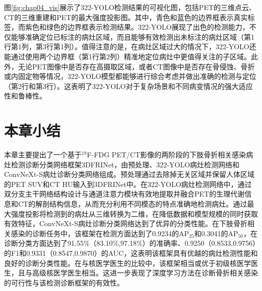图\ref{fig:chap04_vis}展示了322-YOLO检测结果的可视化图，包括PET的三维点云、CT的三维重建和PET的最大强度投影图。其中，青色和蓝色的边界框表示真实标签，而紫色和绿色的边界框表示检测结果。322-YOLO展现了出色的检测能力，不仅能够准确定位已标注的病灶区域，而且能够有效检测出未标注的病灶区域（第1行第1列，第3行第1列）。值得注意的是，在病灶区域过大的情况下，322-YOLO还能通过使用两个边界框（第1行第2列）精准地定位病灶中更值得关注的子区域。此外，无论PET图像中是否存在高摄取区域，或者CT图像中是否存在骨侵蚀、骨折或内固定物等情况，322-YOLO模型都能够进行综合考虑并做出准确的检测与定位（第2行和第3行）。这表明了322-YOLO对于复杂场景和不同病变情况的强大适应性和鲁棒性。

\section{本章小结}

本章主要提出了一个基于\(^{18}\)F-FDG PET/CT影像的两阶段的下肢骨折相关感染病灶检测诊断分类网络框架3DFRINet，由预处理、322-YOLO病灶检测网络和ConvNeXt-S病灶诊断分类网络组成。预处理通过去除掉无关区域并保留人体区域的PET SUV和CT HU输入到3DFRINet中。在322-YOLO病灶检测网络中，通过双分支主干网络结构设计与通道注意力模块有效地提取并融合PET的生理代谢信息和CT的解剖结构信息，从而充分利用不同模态的特点准确地检测病灶。通过最大强度投影将检测到的病灶从三维转换为二维，在降低数据和模型规模的同时获取有效特征，ConvNeXt-S病灶诊断分类网络达到了优异的分类性能。在下肢骨折相关感染的诊断任务中，该框架在检测方面达到了0.9234的AP\(_{25}\)和0.3041的AP\(_{50}\)，在诊断分类方面达到了91.55\%（83.10\%,97.18\%）的准确率、0.9250（0.8533,0.9756）的F1和0.9331（0.8547,0.9870）的AUC，这表明该框架具有优越的病灶检测性能和良好的诊断分类性能。在与核医学医生的比较中，该框架相当或优于初级核医学医生，且与高级核医学医生相当。这进一步表现了深度学习方法在诊断骨折相关感染的可行性与该检测诊断框架的有效性。